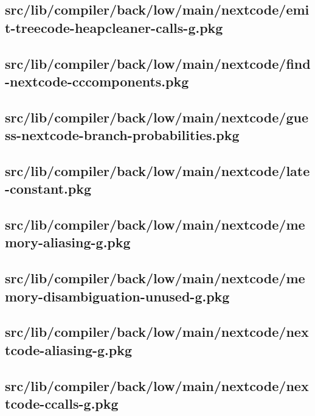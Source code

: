 \subsection{src/lib/compiler/back/low/main/nextcode/emit-treecode-heapcleaner-calls-g.pkg}


\subsection{src/lib/compiler/back/low/main/nextcode/find-nextcode-cccomponents.pkg}


\subsection{src/lib/compiler/back/low/main/nextcode/guess-nextcode-branch-probabilities.pkg}


\subsection{src/lib/compiler/back/low/main/nextcode/late-constant.pkg}


\subsection{src/lib/compiler/back/low/main/nextcode/memory-aliasing-g.pkg}


\subsection{src/lib/compiler/back/low/main/nextcode/memory-disambiguation-unused-g.pkg}


\subsection{src/lib/compiler/back/low/main/nextcode/nextcode-aliasing-g.pkg}


\subsection{src/lib/compiler/back/low/main/nextcode/nextcode-ccalls-g.pkg}



